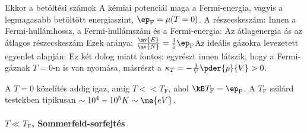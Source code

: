     Ekkor a betöltési számok
    A kémiai potenciál maga a Fermi-energia, vagyis a legmagasabb betöltött energiaszint, $\ep_\text{F}=\mu(T=0)$.
   A részecskeszám:
    Innen a Fermi-hullámhossz, a Fermi-hullámszám és a Fermi-energia:
    Az átlagenergia ás az átlagos részecskeszám
    Ezek aránya: $\frac{\mv{E}}{\mv{N}}=\frac{3}{5}\ep_\text{F}$Az ideális gázokra levezetett  egyenlet alapján:
    Ez két dolog miatt fontos: egyrészt innen látszik, hogy a Fermi-gáznak $T=0$-n is van nyomása, másrészt a $\kappa_T=-\frac{1}{V}\pder{p}{V}>0$.
    
    A $T=0$ közelítés addig igaz, amíg $T<<T_\text{F}$, ahol $\kB T_\text{F}=\ep_\text{F}$.
   A $T_\text{F}$ szilárd testekben tipikusan $\sim 10^4-10^{5} K\sim \me{eV}$.
    
   \paragraph{$T\ll T_\text{F}$, Sommerfeld-sorfejtés}

